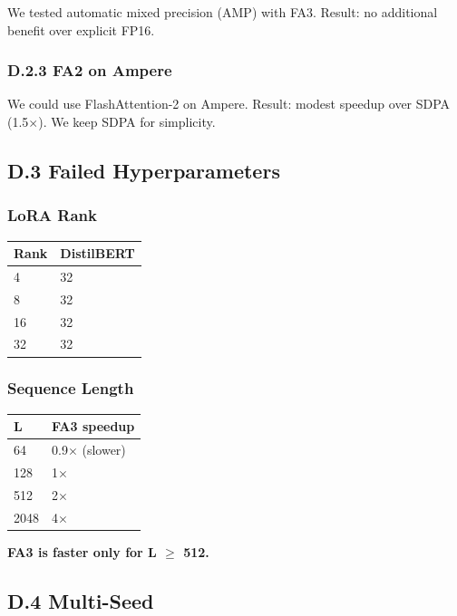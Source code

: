 We tested automatic mixed precision (AMP) with FA3. Result: no additional 
benefit over explicit FP16.

\subsubsection{D.2.3 FA2 on Ampere}

We could use FlashAttention-2 on Ampere. Result: modest speedup over SDPA 
(1.5$\times$). We keep SDPA for simplicity.

\subsection{D.3 Failed Hyperparameters}

\subsubsection{LoRA Rank}

\begin{table}[H]
\centering
\small
\begin{tabular}{ll}
\toprule
\textbf{Rank} & \textbf{DistilBERT} \\
\midrule
4 & 32 \\
8 & 32 \\
16 & 32 \\
32 & 32 \\
\bottomrule
\end{tabular}
\end{table}

\subsubsection{Sequence Length}

\begin{table}[H]
\centering
\small
\begin{tabular}{ll}
\toprule
\textbf{L} & \textbf{FA3 speedup} \\
\midrule
64 & 0.9$\times$ (slower) \\
128 & 1$\times$ \\
512 & 2$\times$ \\
2048 & 4$\times$ \\
\bottomrule
\end{tabular}
\end{table}

\textbf{FA3 is faster only for L $\ge$ 512.}

\subsection{D.4 Multi-Seed}

